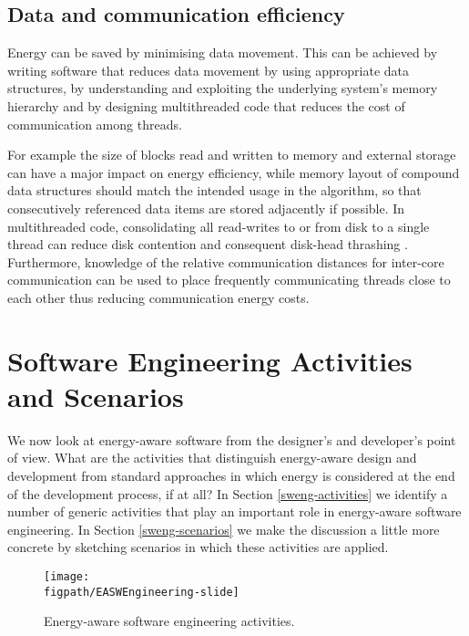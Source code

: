 \documentclass[11pt,oneside]{book}
\begin{document}
\subsection{Data and communication efficiency}

Energy can be saved by minimising data movement. This can be achieved by writing software that reduces data movement by using appropriate data structures, by understanding and exploiting the underlying system's memory hierarchy and by designing multithreaded code that reduces the cost of communication among threads.  

For example the size of blocks read and written to memory and external storage can have a major impact on energy efficiency, while memory layout of compound data structures should match the intended usage in the algorithm, so that consecutively referenced data items are stored adjacently if possible.  In multithreaded code, consolidating all read-writes to or from disk to a single thread can reduce disk contention and consequent disk-head thrashing \cite{Steigerwald_Agrawal_2011}.  Furthermore, knowledge of the relative communication distances for inter-core communication can be used to place frequently communicating threads close to each other \cite{KerrisonSwallow15} thus reducing communication energy costs.





\section{Software Engineering Activities and Scenarios}
\label{sec:scenarios}


We now look at energy-aware software from the designer's and developer's point of view.
What are the activities that distinguish energy-aware design and development from
standard approaches in which energy is considered at the end of the development process, if at all?
In Section \ref{sweng-activities} we identify a number of generic activities that play an
important role in energy-aware software engineering.  In Section \ref{sweng-scenarios} we make the discussion
a little more concrete by sketching scenarios in which these activities are applied.
\begin{figure}
\centerline{\texttt{[image: \\figpath/EASWEngineering-slide]}}
\vspace{-1.5cm}
\caption{Energy-aware software engineering activities.}
\label{fig:EASWEngineering}
\end{figure}
\end{document}
